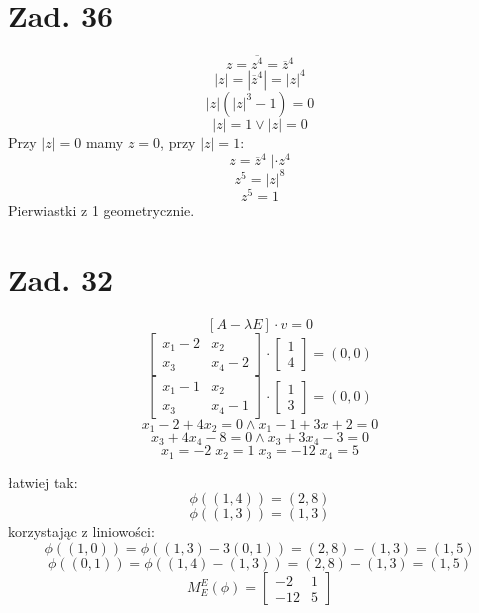 \documentclass[a4paper,fleqn]{article}
\begin{document}
	\section*{Zad. 36}
	\[ z= \overline{z^4} = \overline z ^ 4\]
	\[ |z| = |\overline z ^ 4 |= |z|^4 \]
	\[ |z|(|z|^3 - 1) = 0 \]
	\[ |z| = 1 \lor |z| = 0 \]
	Przy $|z|=0$ mamy  $z=0$, przy $|z|=1$:
	\[ z= \overline z ^ 4 \; |\cdot z^4 \]
	\[ z^5 = |z|^8 \]
	\[ z^5 = 1 \]
	Pierwiastki z 1 geometrycznie. %

	\section*{Zad. 32}
	\[ [A-\lambda E] \cdot v = 0 \]
	\[ \begin{bmatrix}
		x_1 - 2 & x_2 \\
		x_3 & x_4 - 2 \end{bmatrix}
		\cdot \begin{bmatrix} 1 \\ 4 \end{bmatrix}
		= (0,0) \]
	\[ \begin{bmatrix}
		x_1 - 1 & x_2 \\
		x_3 & x_4 - 1 \end{bmatrix}
		\cdot \begin{bmatrix} 1 \\ 3 \end{bmatrix}
		= (0,0) \]
	\[ x_1 -2 + 4x_2 = 0 \land x_1 - 1 + 3x+2 = 0 \]
	\[ x_3 + 4x_4 - 8 = 0 \land x_3 + 3 x_4 -3 =0 \]
	\[ x_1 = -2 \; x_2 = 1 \; x_3 = -12 \; x_4 = 5 \]

	łatwiej tak:
	\[ \phi((1,4)) = (2,8) \]
	\[ \phi((1,3)) = (1,3) \]
	korzystając z liniowości:
	\[ \phi((1,0)) = \phi((1,3)-3(0,1)) =  (2,8)-(1,3) = (1,5) \]
	\[ \phi((0,1)) = \phi((1,4)-(1,3)) = (2,8)-(1,3) = (1,5) \]
	\[ M_E^E (\phi) = \begin{bmatrix} -2 & 1 \\ -12&5 \end{bmatrix} \]
\end{document}

